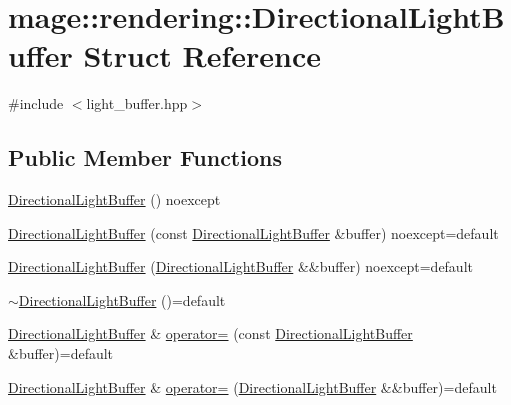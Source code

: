 \hypertarget{structmage_1_1rendering_1_1_directional_light_buffer}{}\section{mage\+:\+:rendering\+:\+:Directional\+Light\+Buffer Struct Reference}
\label{structmage_1_1rendering_1_1_directional_light_buffer}


{\ttfamily \#include $<$light\+\_\+buffer.\+hpp$>$}

\subsection*{Public Member Functions}
\begin{DoxyCompactItemize}
\item 
\mbox{\hyperlink{structmage_1_1rendering_1_1_directional_light_buffer_a618dbd63423f0f008ef18c5e5a7fe560}{Directional\+Light\+Buffer}} () noexcept
\item 
\mbox{\hyperlink{structmage_1_1rendering_1_1_directional_light_buffer_a8bd677130e2bc44b721935396f3ee9ac}{Directional\+Light\+Buffer}} (const \mbox{\hyperlink{structmage_1_1rendering_1_1_directional_light_buffer}{Directional\+Light\+Buffer}} \&buffer) noexcept=default
\item 
\mbox{\hyperlink{structmage_1_1rendering_1_1_directional_light_buffer_a2db095d74145a02eb6c6c306501b04e8}{Directional\+Light\+Buffer}} (\mbox{\hyperlink{structmage_1_1rendering_1_1_directional_light_buffer}{Directional\+Light\+Buffer}} \&\&buffer) noexcept=default
\item 
\mbox{\hyperlink{structmage_1_1rendering_1_1_directional_light_buffer_ac52791a07948b17670c13b4aa0ddb104}{$\sim$\+Directional\+Light\+Buffer}} ()=default
\item 
\mbox{\hyperlink{structmage_1_1rendering_1_1_directional_light_buffer}{Directional\+Light\+Buffer}} \& \mbox{\hyperlink{structmage_1_1rendering_1_1_directional_light_buffer_a99def3f5e0829a7925a0f83ab14c2b58}{operator=}} (const \mbox{\hyperlink{structmage_1_1rendering_1_1_directional_light_buffer}{Directional\+Light\+Buffer}} \&buffer)=default
\item 
\mbox{\hyperlink{structmage_1_1rendering_1_1_directional_light_buffer}{Directional\+Light\+Buffer}} \& \mbox{\hyperlink{structmage_1_1rendering_1_1_directional_light_buffer_a65112cac58ae18d14eb9ae65f316b440}{operator=}} (\mbox{\hyperlink{structmage_1_1rendering_1_1_directional_light_buffer}{Directional\+Light\+Buffer}} \&\&buffer)=default
\end{DoxyCompactItemize}
